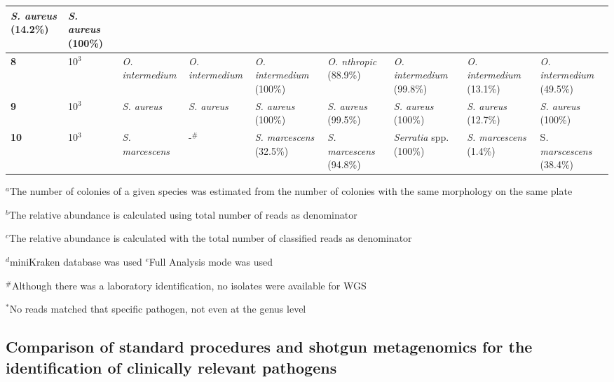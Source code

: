 \begin{table}[]
{\begin{tabular}{@{}|l|l|l|l|lllll|@{}}
  \multicolumn{1}{l|}{\textit{S. aureus} (14.2\%)} &
  \textit{S. aureus} (100\%) \\ \midrule
\textbf{8} &
  10$^3$ &
  \textit{O. intermedium} &
  \textit{O. intermedium} &
  \multicolumn{1}{l|}{\textit{O. intermedium} (100\%)} &
  \multicolumn{1}{l|}{\textit{O. nthropic} (88.9\%)} &
  \multicolumn{1}{l|}{\textit{O. intermedium} (99.8\%)} &
  \multicolumn{1}{l|}{\textit{O. intermedium} (13.1\%)} &
  \textit{O. intermedium} (49.5\%) \\ \midrule
\textbf{9} &
  10$^3$ &
  \textit{S. aureus} &
  \textit{S. aureus} &
  \multicolumn{1}{l|}{\textit{S. aureus} (100\%)} &
  \multicolumn{1}{l|}{\textit{S. aureus} (99.5\%)} &
  \multicolumn{1}{l|}{\textit{S. aureus} (100\%)} &
  \multicolumn{1}{l|}{\textit{S. aureus} (12.7\%)} &
  \textit{S. aureus} (100\%) \\ \midrule
\textbf{10} &
  10$^3$ &
  \textit{S. marcescens} &
  -$^\#$ &
  \multicolumn{1}{l|}{\textit{S. marcescens} (32.5\%)} &
  \multicolumn{1}{l|}{\textit{S. marcescens} (94.8\%)} &
  \multicolumn{1}{l|}{\textit{Serratia} spp. (100\%)} &
  \multicolumn{1}{l|}{\textit{S. marcescens} (1.4\%)} &
  S\textit{. marscescens} (38.4\%) \\ \bottomrule
\end{tabular}%
}
\tiny
\item $^a$The number of colonies of a given species was estimated from the number of colonies with the same morphology on the same plate 
\item $^b$The relative abundance is calculated using total number of reads as denominator
\item $^c$The relative abundance is calculated with the total number of classified reads as denominator
\item $^d$miniKraken database was used
\itel $^e$Full Analysis mode was used 
\item $^\#$Although there was a laboratory identification, no isolates were available for \ac{WGS}
\item $^*$No reads matched that specific pathogen, not even at the genus level
\end{table}

\subsection{Comparison of standard procedures and shotgun metagenomics for the identification of clinically relevant pathogens}

